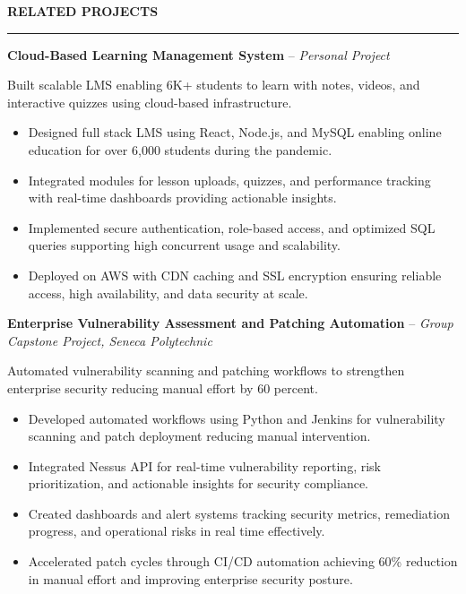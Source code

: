 \documentclass[10pt,letterpaper]{article}
\begin{document}
\vspace{6pt}

\textbf{RELATED PROJECTS}\\[-8pt]
\noindent\rule{\textwidth}{1pt}

\vspace{-2pt}

\textbf{Cloud-Based Learning Management System} -- \emph{Personal Project}

\vspace{-1pt}

Built scalable LMS enabling 6K+ students to learn with notes, videos, and interactive quizzes using cloud-based infrastructure.
\vspace{-1pt}
\begin{itemize}
\item Designed full stack LMS using React, Node.js, and MySQL enabling online education for over 6,000 students during the pandemic.
\item Integrated modules for lesson uploads, quizzes, and performance tracking with real-time dashboards providing actionable insights.
\item Implemented secure authentication, role-based access, and optimized SQL queries supporting high concurrent usage and scalability.
\item Deployed on AWS with CDN caching and SSL encryption ensuring reliable access, high availability, and data security at scale.
\end{itemize}

\textbf{Enterprise Vulnerability Assessment and Patching Automation} -- \emph{Group Capstone Project, Seneca Polytechnic }

\vspace{-1pt}

Automated vulnerability scanning and patching workflows to strengthen enterprise security reducing manual effort by 60 percent.
\vspace{-1pt}
\begin{itemize}
\item Developed automated workflows using Python and Jenkins for vulnerability scanning and patch deployment reducing manual intervention.
\item Integrated Nessus API for real-time vulnerability reporting, risk prioritization, and actionable insights for security compliance.
\item Created dashboards and alert systems tracking security metrics, remediation progress, and operational risks in real time effectively.
\item Accelerated patch cycles through CI/CD automation achieving 60\% reduction in manual effort and improving enterprise security posture.
\end{itemize}
\end{document}
